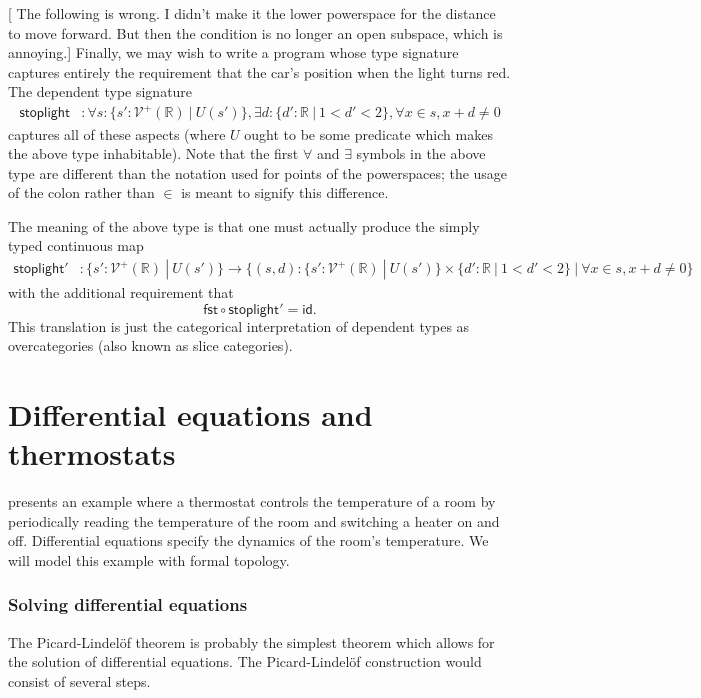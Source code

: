 \documentclass{article}           %
\newcommand{\R}{\mathbb{R}}
\newcommand{\suchthat}{\ |\ }
\newcommand{\Viet}{{\mathcal{V}^+}}
\begin{document}
[ The following is wrong. I didn't make it the lower powerspace for the distance to move forward. But then the condition is no longer an open subspace, which is annoying.]
Finally, we may wish to write a program whose type signature captures entirely the requirement that the car's position when the light turns red. The dependent type signature
\begin{align*}
\mathsf{stoplight} &: \forall s : \{ s' : \Viet(\R) \suchthat U(s') \},
  \exists d : \{ d' : \R \suchthat 1 < d' < 2 \},
  \forall x \in s,  x + d \ne 0
\end{align*}
captures all of these aspects (where $U$ ought to be some predicate which makes the above type inhabitable). Note that the first $\forall$ and $\exists$ symbols in the above type are different than the notation used for points of the powerspaces; the usage of the colon rather than $\in$ is meant to signify this difference.

The meaning of the above type is that one must actually produce the simply typed continuous map
\begin{align*}
\mathsf{stoplight}' &: \{ s' : \Viet(\R) \suchthat U(s') \}
  \to \{ (s, d) : \{ s' : \Viet(\R) \suchthat U(s') \} \times \{ d' : \R \suchthat 1 < d' < 2 \}
                   \suchthat \forall x \in s, x + d \ne 0 \}
\end{align*}
with the additional requirement that
\[
\mathsf{fst} \circ \mathsf{stoplight}' = \mathsf{id}.
\]
This translation is just the categorical interpretation of dependent types as overcategories (also known as slice categories).

\section{Differential equations and thermostats}

\cite{smooth-interp} presents an example where a thermostat controls the temperature of a room by periodically reading the temperature of the room and switching a heater on and off.  Differential equations specify the dynamics of the room's temperature. We will model this example with formal topology.

\subsubsection{Solving differential equations}

The Picard-Lindelöf theorem is probably the simplest theorem which allows for the solution of differential equations. The Picard-Lindelöf construction would consist of several steps.
\end{document}
